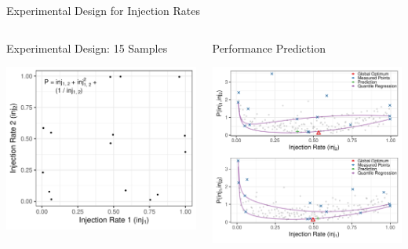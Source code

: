 \documentclass[10pt, compress, aspectratio=169, xcolor={table,usenames,dvipsnames}]{beamer}
\begin{document}
\begin{frame}[label={sec:orgba0b14d}]{Experimental Design for Injection Rates}
\begin{columns}
\begin{column}{0.5\columnwidth}
\begin{block}{Experimental Design: 15 Samples}
\begin{center}
\includegraphics[width=\columnwidth]{../../../img/injection_rates_federov.pdf}
\end{center}
\end{block}
\end{column}
\begin{column}{0.5\columnwidth}
\begin{block}{Performance Prediction}
\begin{center}
\includegraphics[width=\columnwidth]{../../../img/injection_rates_quantile.pdf}
\end{center}
\end{block}
\end{column}
\end{columns}
\end{frame}
\end{document}
